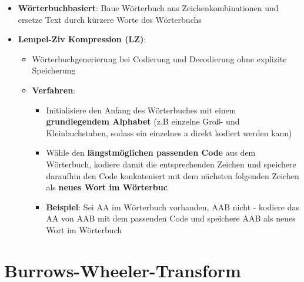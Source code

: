 \documentclass[10pt,a4paper]{article}
\begin{document}
	\begin{itemize}
		\item \textbf{Wörterbuchbasiert}: Baue Wörterbuch aus Zeichenkombinationen und ersetze Text durch kürzere Worte des Wörterbuchs
		\item \textbf{Lempel-Ziv Kompression (LZ)}:
		\begin{itemize}
			\item Wörterbuchgenerierung bei Codierung und Decodierung ohne explizite Speicherung
			\item \textbf{Verfahren}:
			\begin{itemize}
				\item Initialisiere den Anfang des Wörterbuches mit einem \textbf{grundlegendem Alphabet} (z.B einzelne Groß- und Kleinbuchstaben, sodass ein einzelnes a direkt kodiert werden kann)
			 	\item Wähle den \textbf{längstmöglichen passenden Code} aus dem Wörterbuch, kodiere damit die entsprechenden Zeichen und speichere daraufhin den Code konkateniert mit dem nächsten folgenden Zeichen als \textbf{neues Wort im Wörterbuc}
			 	\item \textbf{Beispiel}: Sei AA im Wörterbuch vorhanden, AAB nicht - kodiere das AA von AAB mit dem passenden Code und speichere AAB als neues Wort im Wörterbuch
			 \end{itemize} 
		\end{itemize}
	\end{itemize}

	\newpage
	\section{Burrows-Wheeler-Transform}
	\label{bwt:sec:burrows_wheeler_transform}
	
\end{document}

